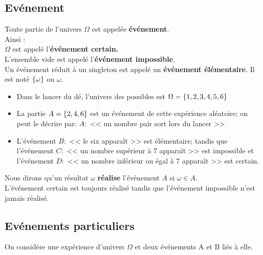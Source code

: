 \subsection*{Evénement}

\begin{definition}
Toute partie de l'univers $ \Omega $ est appelée \textbf{ événement}.\\
Ainsi :\\
$ \Omega $ est appelé l’\textbf{événement certain.}\\
L’ensemble vide est appelé l’\textbf{événement impossible}.\\
Un événement réduit à un singleton est appelé un \textbf{événement élémentaire}. Il est noté $ \left\{\omega\right\} $  ou $ \omega $.

\end{definition}

\begin{example}
\begin{itemize}
\item Dans le lancer du dé, l'univers des possibles est $ \Omega =\left\{1,2,3,4,5,6\right\} $ 
\item La partie $ A=\left\{2,4,6\right\} $ est un événement de cette expérience aléatoire; on peut le décrire par: $ A :$  << un nombre pair sort lors du lancer >>
\item  L'événement $ B: $  << le six apparaît >> est élémentaire; tandis que l'événement $ C: $  << un nombre       supérieur à 7 apparaît >> est impossible  et l'événement $ D: $  << un nombre inférieur ou égal à 7 apparaît >> est certain.
\end{itemize}
\end{example}
\begin{remark}
Nous dirons qu'un résultat $ \omega $  \textbf{réalise} l'événement $ A $ si  $ \omega\in A. $\\
L'événement certain est toujours réalisé tandis que l'événement impossible n'est jamais réalisé.
\end{remark}
\subsection*{Evénements particuliers}
On considère une expérience d’univers  $ \Omega $ et deux événements A et B liés à elle.


